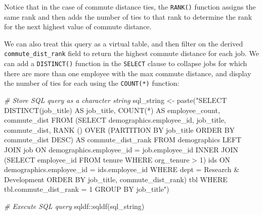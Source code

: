 \documentclass[
]{book}
\newenvironment{Shaded}{\begin{snugshade}}{\end{snugshade}}
\newcommand{\CommentTok}[1]{\textcolor[rgb]{0.56,0.35,0.01}{\textit{#1}}}
\newcommand{\FunctionTok}[1]{\textcolor[rgb]{0.00,0.00,0.00}{#1}}
\newcommand{\NormalTok}[1]{#1}
\newcommand{\OtherTok}[1]{\textcolor[rgb]{0.56,0.35,0.01}{#1}}
\newcommand{\SpecialCharTok}[1]{\textcolor[rgb]{0.00,0.00,0.00}{#1}}
\newcommand{\StringTok}[1]{\textcolor[rgb]{0.31,0.60,0.02}{#1}}
\begin{document}
Notice that in the case of commute distance ties, the \texttt{RANK()} function assigns the same rank and then adds the number of ties to that rank to determine the rank for the next highest value of commute distance.

We can also treat this query as a virtual table, and then filter on the derived \texttt{commute\_dist\_rank} field to return the highest commute distance for each job. We can add a \texttt{DISTINCT()} function in the \texttt{SELECT} clause to collapse jobs for which there are more than one employee with the max commute distance, and display the number of ties for each using the \texttt{COUNT(*)} function:

\begin{Shaded}
\begin{Highlighting}[]
\CommentTok{\# Store SQL query as a character string}
\NormalTok{sql\_string }\OtherTok{\textless{}{-}} \FunctionTok{paste}\NormalTok{(}\StringTok{"SELECT}
\StringTok{                        DISTINCT(job\_title) AS job\_title,}
\StringTok{                        COUNT(*) AS employee\_count,}
\StringTok{                        commute\_dist}
\StringTok{                     FROM}
\StringTok{                        (SELECT}
\StringTok{                          demographics.employee\_id,}
\StringTok{                          job\_title,}
\StringTok{                          commute\_dist,}
\StringTok{                          RANK () OVER (PARTITION BY job\_title ORDER BY commute\_dist DESC) AS commute\_dist\_rank}
\StringTok{                        FROM}
\StringTok{                            demographics}
\StringTok{                          LEFT JOIN}
\StringTok{                            job}
\StringTok{                          ON}
\StringTok{                            demographics.employee\_id = job.employee\_id}
\StringTok{                          INNER JOIN}
\StringTok{                            (SELECT employee\_id FROM tenure WHERE org\_tenure \textgreater{} 1) ids}
\StringTok{                          ON}
\StringTok{                            demographics.employee\_id = ids.employee\_id}
\StringTok{                        WHERE}
\StringTok{                          dept = \textquotesingle{}Research \& Development\textquotesingle{}}
\StringTok{                        ORDER BY}
\StringTok{                          job\_title,}
\StringTok{                          commute\_dist\_rank) tbl}
\StringTok{                      WHERE}
\StringTok{                        tbl.commute\_dist\_rank = 1}
\StringTok{                      GROUP BY}
\StringTok{                        job\_title"}\NormalTok{)}

\CommentTok{\# Execute SQL query}
\NormalTok{sqldf}\SpecialCharTok{::}\FunctionTok{sqldf}\NormalTok{(sql\_string)}
\end{Highlighting}
\end{Shaded}
\end{document}
